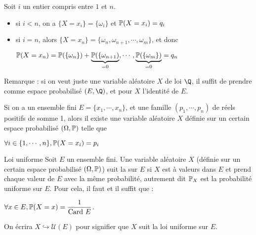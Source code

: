 \documentclass[12pt,a4paper]{report}
\begin{document}
\begin{remarque}{}
\begin{demo}{}
Soit $i$ un entier compris entre $1$ et $n$.
\begin{itemize}
	\item si $i < n$, on a $\{X = x_i\} = \{\omega_i\}$ et $\mathbb{P}(X = x_i) = q_i$
	\item si $i = n$, alors $\{X = x_n\} = \{\omega_n, \omega_{n+1},\cdots,\omega_m\}$, et donc 
	\begin{center}
	$\mathbb{P}(X=x_n) = \mathbb{P}(\{\omega_n\}) + \underbrace{\mathbb{P}(\{\omega_{n+1})}_{ = 0},\cdots,\underbrace{\mathbb{P}(\{\omega_m\})}_{= 0} = q_n$
	\end{center}
\end{itemize}

Remarque : si on veut juste une variable aléatoire $X$ de loi $\Q$, il suffit de prendre comme espace probabilisé $(E,\Q)$, et pour $X$ l'identité de $E$.

\begin{remarque}[Bilan]{}
Si on a un ensemble fini $E=\{x_1,\cdots,x_n\}$, et une famille $(p_1,\cdots,p_n)$ de réels positifs de somme 1, alors il existe une variable aléatoire $X$ définie sur un certain espace probabilisé $(\Omega,\mathbb{P})$ telle que 
\begin{center}
$\forall i \in \{1,\cdots,n\}, \mathbb{P}(X=x_i) = p_i$
\end{center}
\end{remarque}
\end{demo}
\end{remarque}

\begin{exemple}{Loi uniforme}{}
Soit $E$ un ensemble fini. Une variable aléatoire $X$ (définie sur un certain espace probabilisé $(\Omega,\mathbb{P})$) suit la  sur $E$ si $X$ est à valeurs dans $E$ et prend chaque valeur de $E$ avec la même probabilité, autrement dit $\mathbb{P}_X$ est la probabilité uniforme sur $E$. Pour cela, il faut et il suffit que :
\begin{center}
$\forall x \in E, \mathbb{P}(X=x) = \dfrac{1}{\text{Card } E}$.
\end{center}

On écrira $X \hookrightarrow \mathcal{U}(E)$ pour signifier que $X$ suit la loi uniforme sur $E$.

\end{exemple}
\end{document}
